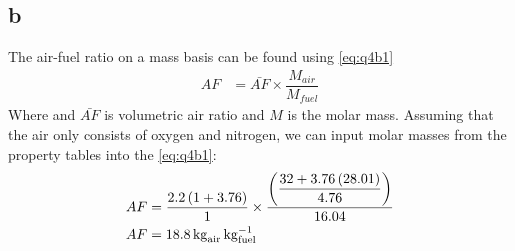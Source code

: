 \documentclass[11pt]{article}
\numberwithin{equation}{section}
\begin{document}
\subsection{b}
The air-fuel ratio on a mass basis can be found using \ref{eq:q4b1}
\begin{align}
    AF &= \bar{AF} \times \dfrac{M_{air}}{M_{fuel}} \label{eq:q4b1}
\end{align}
Where and $\bar{AF}$ is volumetric air ratio and $M$ is the molar mass. Assuming that the air only consists of oxygen and nitrogen, we can input molar masses from the property tables into the \ref{eq:q4b1}:
\begin{align}
    AF &= \dfrac{2.2\left(1 + 3.76\right)}{1} \times  \dfrac{\left(\dfrac{32+3.76\left(28.01\right)}{4.76}\right)}{16.04}\\
    AF &= \SI{18.8}{\kg\of{air}\per\kg\of{fuel}}
\end{align}
\end{document}
